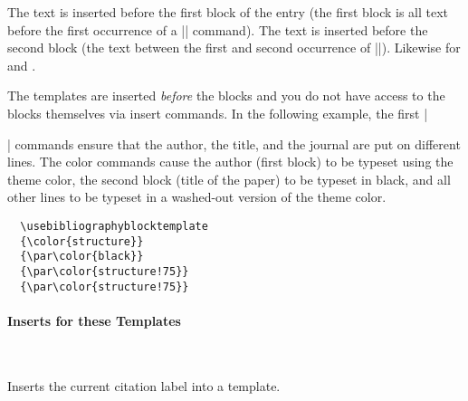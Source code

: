 \begin{command}{\usebibliographyblocktemplate%
    }
  The text  is inserted before the first block of the
  entry (the first block is all text before the first occurrence of a 
  |\newblock| command). The text  is inserted before
  the second block (the text between the first and second occurrence
  of |\newblock|). Likewise for  and . 

  The templates are inserted \emph{before} the blocks and you do not
  have access to the blocks themselves via insert commands. In the
  following example, the first |\par| commands ensure that the
  author, the title, and the journal are put on different lines. The
  color commands cause the author (first block) to be typeset using
  the theme color, the second block (title of the paper) to be typeset
  in black, and all other lines to be typeset in a washed-out version
  of the theme color. 
  \example
\begin{verbatim}
  \usebibliographyblocktemplate
  {\color{structure}}
  {\par\color{black}}
  {\par\color{structure!75}}
  {\par\color{structure!75}}
\end{verbatim}
\end{command}


\paragraph{Inserts for these Templates}\ 

\begin{command}{\insertbiblabel}
  Inserts the current citation label into a template.
\end{command}






